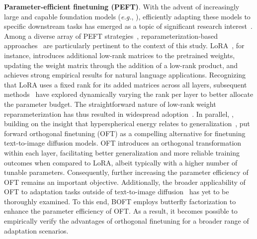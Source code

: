\textbf{Parameter-efficient finetuning (PEFT)}. With the advent of increasingly large and capable foundation models (\emph{e.g.}, \cite{brown2020language,radford2021learning,rombach2022high,kirillov2023segment}), efficiently adapting these models to specific downstream tasks has emerged as a topic of significant research interest~\cite{treviso2023efficient,ding2023parameter,lialin2023scaling}. Among a diverse array of PEFT strategies~\cite{houlsby2019parameter,aghajanyan2020intrinsic,hulora2022,edalati2022krona,wang2022adamix,gheini2021cross,zaken2022bitfit,guo2020parameter,sung2021training,ansell2022composable,lester2021power,li2021prefix,vu2022spot,he2021towards,mao2021unipelt,karimi2021compacter,liu2022few,sung2022lst,chen2022parameter,jia2022visual,chen2022adaptformer,zhang2022neural,jie2023fact,lian2022scaling,luo2023towards}, reparameterization-based approaches~\cite{aghajanyan2020intrinsic,hulora2022,edalati2022krona} are particularly pertinent to the context of this study. LoRA~\cite{hulora2022}, for instance, introduces additional low-rank matrices to the pretrained weights, updating the weight matrix through the addition of a low-rank product, and achieves strong empirical results for natural language applications. Recognizing that LoRA uses a fixed rank for its added matrices across all layers, subsequent methods~\cite{zhang2022adaptive,valipour2022dylora,zhang2023increlora} have explored dynamically varying the rank per layer to better allocate the parameter budget. The straightforward nature of low-rank weight reparameterization has thus resulted in widespread adoption~\cite{dettmers2023qlora,zi2023delta,chavan2023one}. In parallel, \cite{qiu2023controlling}, building on the insight that hyperspherical energy relates to generalization~\cite{liu2018learning,liu2021orthogonal}, put forward orthogonal finetuning (OFT) as a compelling alternative for finetuning text-to-image diffusion models. OFT introduces an orthogonal transformation within each layer, facilitating better generalization and more reliable training outcomes when compared to LoRA, albeit typically with a higher number of tunable parameters. Consequently, further increasing the parameter efficiency of OFT remains an important objective. Additionally, the broader applicability of OFT to adaptation tasks outside of text-to-image diffusion~\cite{qiu2023controlling} has yet to be thoroughly examined. To this end, BOFT employs butterfly factorization to enhance the parameter efficiency of OFT. As a result, it becomes possible to empirically verify the advantages of orthogonal finetuning for a broader range of adaptation scenarios.

